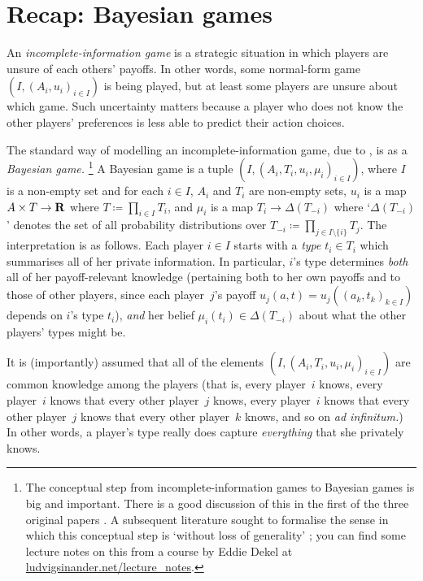 \documentclass[11pt,letterpaper,reqno,oneside]{book}
\begin{document}
\section{Recap: Bayesian games}
\label{ch0:incomplete}

An \emph{incomplete-information game} is a strategic situation in which players are unsure of each others' payoffs. In other words, some normal-form game $\left( I, (A_i,u_i)_{i \in I} \right)$ is being played, but at least some players are unsure about which game. Such uncertainty matters because a player who does not know the other players' preferences is less able to predict their action choices.

The standard way of modelling an incomplete-information game, due to \textcite{Harsanyi1967,Harsanyi1968a,Harsanyi1968b}, is as a \emph{Bayesian game.}%
	\footnote{The conceptual step from incomplete-information games to Bayesian games is big and important. There is a good discussion of this in the first of the three original papers \parencite{Harsanyi1967}. A subsequent literature sought to formalise the sense in which this conceptual step is `without loss of generality' \parencite[e.g.][]{ArmbrusterBoge1979,BogeEisele1979,MertensZamir1985,BrandenburgerDekel1993}; you can find some lecture notes on this from a course by Eddie Dekel at \href{https://ludvigsinander.net/lecture_notes.html}{ludvigsinander.net/lecture\_notes}.}
A Bayesian game is a tuple $\left( I, (A_i,T_i,u_i,\mu_i)_{i \in I} \right)$, where $I$ is a non-empty set and for each $i \in I$, $A_i$ and $T_i$ are non-empty sets, $u_i$ is a map $A \times T \to \mathbf{R}$ where $T \coloneqq \prod_{i \in I} T_i$, and $\mu_i$ is a map $T_i \to \Delta(T_{-i})$ where `$\Delta(T_{-i})$' denotes the set of all probability distributions over $T_{-i} \coloneqq \prod_{j \in I \setminus \{i\}} T_j$. The interpretation is as follows. Each player $i \in I$ starts with a \emph{type} $t_i \in T_i$ which summarises all of her private information. In particular, $i$'s type determines \emph{both} all of her payoff-relevant knowledge (pertaining both to her own payoffs and to those of other players, since each player~$j$'s payoff $u_j(a,t) = u_j((a_k,t_k)_{k \in I})$ depends on $i$'s type $t_i$), \emph{and} her belief $\mu_i(t_i) \in \Delta(T_{-i})$ about what the other players' types might be.

It is (importantly) assumed that all of the elements $\left( I, (A_i,T_i,u_i,\mu_i)_{i \in I} \right)$ are common knowledge among the players (that is, every player~$i$ knows, every player~$i$ knows that every other player~$j$ knows, every player~$i$ knows that every other player~$j$ knows that every other player~$k$ knows, and so on \emph{ad infinitum.}) In other words, a player's type really does capture \emph{everything} that she privately knows.
\end{document}
